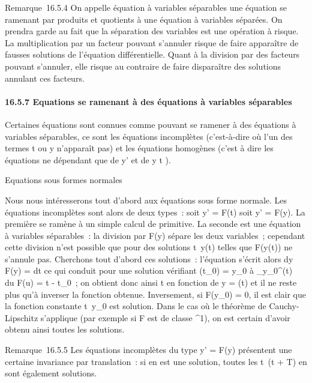 \documentclass[]{article}
\begin{document}
Remarque~16.5.4 On appelle équation à variables séparables une équation
se ramenant par produits et quotients à une équation à variables
séparées. On prendra garde au fait que la séparation des variables est
une opération à risque. La multiplication par un facteur pouvant
s'annuler risque de faire apparaître de fausses solutions de l'équation
différentielle. Quant à la division par des facteurs pouvant s'annuler,
elle risque au contraire de faire disparaître des solutions annulant ces
facteurs.

\paragraph{16.5.7 Equations se ramenant à des équations à variables
séparables}

Certaines équations sont connues comme pouvant se ramener à des
équations à variables séparables, ce sont les équations incomplètes
(c'est-à-dire où l'un des termes t ou y n'apparaît pas) et les équations
homogènes (c'est à dire les équations ne dépendant que de y' et de  y
\over t ).

Equations sous formes normales

Nous nous intéresserons tout d'abord aux équations sous forme normale.
Les équations incomplètes sont alors de deux types~: soit y' = F(t) soit
y' = F(y). La première se ramène à un simple calcul de primitive. La
seconde est une équation à variables séparables~: la division par F(y)
sépare les deux variables~; cependant cette division n'est possible que
pour des solutions t\mapsto~y(t) telles que F(y(t))
ne s'annule pas. Cherchons tout d'abord ces solutions~: l'équation
s'écrit alors  dy \over F(y) = dt ce qui conduit pour
une solution vérifiant \phi(t\_0) = y\_0 à
\int  \_y\_0^\phi(t)~ du
\over F(u) = t - t\_0~; on obtient donc ainsi t
en fonction de y = \phi(t) et il ne reste plus qu'à inverser la fonction
obtenue. Inversement, si F(y\_0) = 0, il est clair que la
fonction constante t\mapsto~y\_0 est
solution. Dans le cas où le théorème de Cauchy-Lipschitz s'applique (par
exemple si F est de classe ^1), on est certain d'avoir
obtenu ainsi toutes les solutions.

Remarque~16.5.5 Les équations incomplètes du type y' = F(y) présentent
une certaine invariance par translation~: si \phi en est une solution,
toutes les t\mapsto~\phi(t + T) en sont également
solutions.
\end{document}
